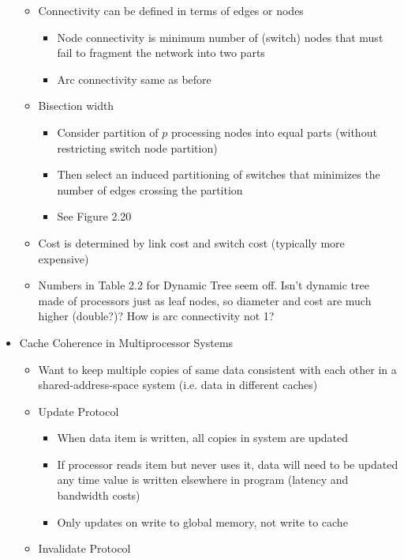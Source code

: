 \documentclass[a4paper]{article}
\begin{document}
\begin{itemize}
\begin{itemize}
      \item Connectivity can be defined in terms of edges or nodes
        \begin{itemize}
          \item Node connectivity is minimum number of (switch) nodes that must fail to fragment the network into two parts
          \item Arc connectivity same as before
        \end{itemize}
      \item Bisection width
        \begin{itemize}
          \item Consider partition of $p$ processing nodes into equal parts (without restricting switch node partition)
          \item Then select an induced partitioning of switches that minimizes the number of edges crossing the partition
          \item See Figure 2.20
        \end{itemize}
      \item Cost is determined by link cost and switch cost (typically more expensive)
      \item \color{red} Numbers in Table 2.2 for Dynamic Tree seem off. Isn't dynamic tree made of processors just as leaf nodes, so diameter and cost
        are much higher (double?)? How is arc connectivity not 1?
    \end{itemize}
  \item Cache Coherence in Multiprocessor Systems
    \begin{itemize}
      \item Want to keep multiple copies of same data consistent with each other in a shared-address-space system (i.e. data in different caches)
      \item Update Protocol
        \begin{itemize}
          \item When data item is written, all copies in system are updated
          \item If processor reads item but never uses it, data will need to be updated any time value is written elsewhere in program (latency and
            bandwidth costs)
          \item Only updates on write to global memory, not write to cache
        \end{itemize}
      \item Invalidate Protocol
        \begin{itemize}

\end{itemize}
\end{itemize}
\end{itemize}
\end{document}
